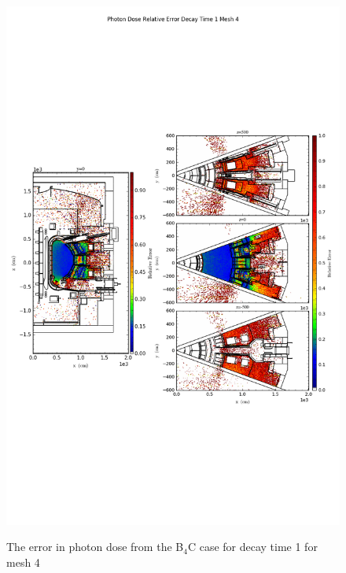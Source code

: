 \begin{figure}[ht!]
\centering
\includegraphics[trim={0cm 9cm 0cm 10cm},clip,scale=0.75]{../plots/final_model_with_b4c/Photon_Dose_Relative_Error_Decay_Time_1_Mesh_4.png}
\label{fig:photons_dc1_no4bc_m4_error}
\caption{The error in photon dose from the B$_4$C case for decay time 1 for mesh 4}
\end{figure}
